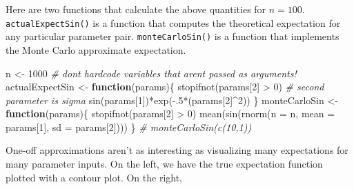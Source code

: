 \documentclass[
  12pt,
]{krantz}
\makeatletter
\newenvironment{Shaded}{\begin{snugshade}}{\end{snugshade}}
\newcommand{\AttributeTok}[1]{\textcolor[rgb]{0.61,0.61,0.61}{#1}}
\newcommand{\CommentTok}[1]{\textcolor[rgb]{0.37,0.37,0.37}{\textit{#1}}}
\newcommand{\ControlFlowTok}[1]{\textcolor[rgb]{0.27,0.27,0.27}{\textbf{#1}}}
\newcommand{\DecValTok}[1]{\textcolor[rgb]{0.06,0.06,0.06}{#1}}
\newcommand{\FunctionTok}[1]{\textcolor[rgb]{0,0,0}{#1}}
\newcommand{\NormalTok}[1]{#1}
\newcommand{\OtherTok}[1]{\textcolor[rgb]{0.37,0.37,0.37}{#1}}
\newcommand{\SpecialCharTok}[1]{\textcolor[rgb]{0,0,0}{#1}}
\newenvironment{kframe}{%
\medskip{}
\setlength{\fboxsep}{.8em}
 \def\at@end@of@kframe{}%
 \ifinner\ifhmode%
  \def\at@end@of@kframe{\end{minipage}}%
  \begin{minipage}{\columnwidth}%
 \fi\fi%
 \def\FrameCommand##1{\hskip\@totalleftmargin \hskip-\fboxsep
 \colorbox{shadecolor}{##1}\hskip-\fboxsep
     \hskip-\linewidth \hskip-\@totalleftmargin \hskip\columnwidth}%
 \MakeFramed {\advance\hsize-\width
   \@totalleftmargin\z@ \linewidth\hsize
   \@setminipage}}%
 {\par\unskip\endMakeFramed%
 \at@end@of@kframe}
\renewenvironment{Shaded}{\begin{kframe}}{\end{kframe}}
\makeatother
\begin{document}
Here are two functions that calculate the above quantities for \(n=100\). \texttt{actualExpectSin()} is a function that computes the theoretical expectation for any particular parameter pair. \texttt{monteCarloSin()} is a function that implements the Monte Carlo approximate expectation.

\begin{Shaded}
\begin{Highlighting}[]
\NormalTok{n }\OtherTok{\textless{}{-}} \DecValTok{1000} \CommentTok{\# don\textquotesingle{}t hardcode variables that aren\textquotesingle{}t passed as arguments!}
\NormalTok{actualExpectSin }\OtherTok{\textless{}{-}} \ControlFlowTok{function}\NormalTok{(params)\{}
  \FunctionTok{stopifnot}\NormalTok{(params[}\DecValTok{2}\NormalTok{] }\SpecialCharTok{\textgreater{}} \DecValTok{0}\NormalTok{) }\CommentTok{\# second parameter is sigma}
  \FunctionTok{sin}\NormalTok{(params[}\DecValTok{1}\NormalTok{])}\SpecialCharTok{*}\FunctionTok{exp}\NormalTok{(}\SpecialCharTok{{-}}\NormalTok{.}\DecValTok{5}\SpecialCharTok{*}\NormalTok{(params[}\DecValTok{2}\NormalTok{]}\SpecialCharTok{\^{}}\DecValTok{2}\NormalTok{))}
\NormalTok{\}}
\NormalTok{monteCarloSin }\OtherTok{\textless{}{-}} \ControlFlowTok{function}\NormalTok{(params)\{}
  \FunctionTok{stopifnot}\NormalTok{(params[}\DecValTok{2}\NormalTok{] }\SpecialCharTok{\textgreater{}} \DecValTok{0}\NormalTok{) }
  \FunctionTok{mean}\NormalTok{(}\FunctionTok{sin}\NormalTok{(}\FunctionTok{rnorm}\NormalTok{(}\AttributeTok{n =}\NormalTok{ n, }\AttributeTok{mean =}\NormalTok{ params[}\DecValTok{1}\NormalTok{], }\AttributeTok{sd =}\NormalTok{ params[}\DecValTok{2}\NormalTok{])))}
\NormalTok{\}}
\CommentTok{\# monteCarloSin(c(10,1))}
\end{Highlighting}
\end{Shaded}

One-off approximations aren't as interesting as visualizing many expectations for many parameter inputs. On the left, we have the true expectation function plotted with a contour plot. On the right,
\end{document}
